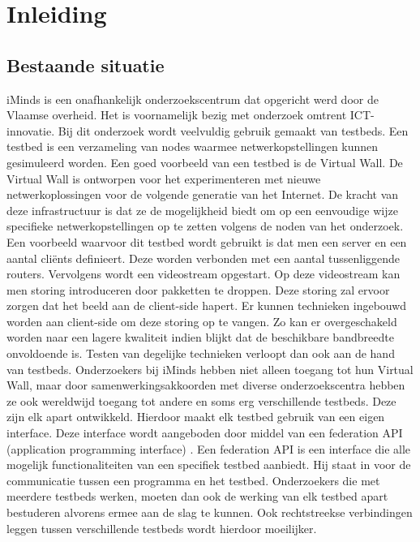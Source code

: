 \newpage
\chapter{Inleiding}
\section{Bestaande situatie}
\npar
iMinds is een onafhankelijk onderzoekscentrum dat opgericht werd door de Vlaamse overheid.
Het is voornamelijk bezig met onderzoek omtrent ICT-innovatie. Bij dit onderzoek wordt veelvuldig gebruik gemaakt van testbeds. Een testbed is een verzameling van nodes waarmee netwerkopstellingen kunnen gesimuleerd worden. 
\npar
Een goed voorbeeld van een testbed is de Virtual Wall. De Virtual Wall is ontworpen voor het experimenteren met nieuwe netwerkoplossingen voor de volgende generatie van het Internet. De kracht van deze infrastructuur is dat ze de mogelijkheid biedt om op een eenvoudige wijze specifieke netwerkopstellingen op te zetten volgens de noden van het onderzoek. 
\npar
Een voorbeeld waarvoor dit testbed wordt gebruikt is dat men een server en een aantal cli\"ents definieert. Deze worden verbonden met een aantal tussenliggende routers. Vervolgens wordt een videostream opgestart. Op deze videostream kan men storing introduceren door pakketten te droppen. Deze storing zal ervoor zorgen dat het beeld aan de client-side hapert. Er kunnen technieken ingebouwd worden aan client-side om deze storing op te vangen. Zo kan er overgeschakeld worden naar een lagere kwaliteit indien blijkt dat de beschikbare bandbreedte onvoldoende is. Testen van degelijke technieken verloopt dan ook aan de hand van testbeds.
\npar
Onderzoekers bij iMinds hebben niet alleen toegang tot hun Virtual Wall, maar door samenwerkingsakkoorden met diverse onderzoekscentra hebben ze ook wereldwijd toegang tot andere en soms erg verschillende testbeds. Deze zijn elk apart ontwikkeld. Hierdoor maakt elk testbed gebruik van een eigen interface. Deze interface wordt aangeboden door middel van een federation API (application programming interface) . Een federation API is een interface die alle mogelijk functionaliteiten van een specifiek testbed aanbiedt. Hij staat in voor de communicatie tussen een programma en het testbed. Onderzoekers die met meerdere testbeds werken, moeten dan ook de werking van elk testbed apart bestuderen alvorens ermee aan de slag te kunnen. Ook rechtstreekse verbindingen leggen tussen verschillende testbeds wordt hierdoor moeilijker. 
\npar
